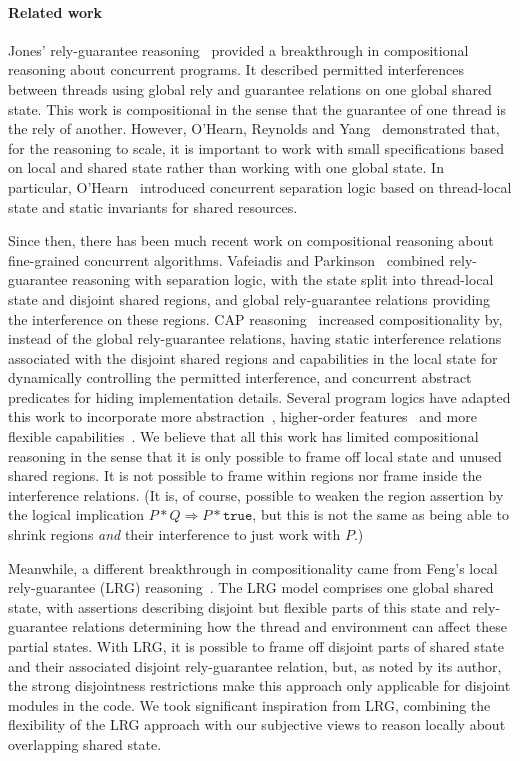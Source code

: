 \paragraph{Related work}
Jones' rely-guarantee reasoning~\cite{rg} provided a breakthrough in
compositional reasoning about concurrent programs. It described
permitted interferences between threads using global rely and
guarantee relations on one  global shared state. This work is
compositional in the sense that the guarantee of one thread is the
rely of another. However, O'Hearn, Reynolds and
Yang~\cite{o2001local} demonstrated that, for the
reasoning to scale, it is important to work with small specifications
based on local and shared state rather than working with one
global state. In particular, O'Hearn~\cite{csl-tcs} introduced concurrent
separation logic based on thread-local state and static invariants for
shared resources.

Since then, there has been much recent work on compositional
reasoning about fine-grained concurrent algorithms. Vafeiadis and
Parkinson~\cite{viktor-marriage} combined rely-guarantee reasoning with
separation logic, with the state split into thread-local state and
disjoint shared regions, and global rely-guarantee relations providing
the interference on these regions. 
CAP reasoning~\cite{cap-ecoop10} increased  compositionality by, instead of the
global
rely-guarantee relations, having static interference relations
associated with the disjoint shared regions and capabilities in the local
state for dynamically controlling the permitted  interference, and concurrent
abstract predicates for hiding implementation details. Several
program logics have adapted this work to incorporate more
abstraction~\cite{caresl}, higher-order features~\cite{icap} and more flexible
capabilities~\cite{tada}. We believe that all  this work has  limited compositional
reasoning in the sense that it is only possible to frame off local
state and unused shared regions. It is not possible to 
frame within regions nor frame inside the interference
relations.  (It is, of course, possible to weaken the region assertion
by the logical implication $P * Q \Rightarrow P * \texttt{true}$, but this is
not the same as being able to shrink regions \emph{and} their interference to
just work with $P$.) 

Meanwhile, a different breakthrough in compositionality came from
Feng's local rely-guarantee (LRG) reasoning~\cite{lrg}. The LRG model
comprises one global shared state, with assertions describing
{disjoint} but flexible parts of this state and rely-guarantee
relations determining how the thread and environment can affect these
partial states. With LRG, it is possible to frame off disjoint parts of
shared state and their associated disjoint rely-guarantee relation, but, as noted
by its author, the strong disjointness restrictions make this approach
only applicable for disjoint modules in the code. We took significant
inspiration from LRG, combining the flexibility of the LRG approach
with our subjective views to reason locally about overlapping shared
state.

